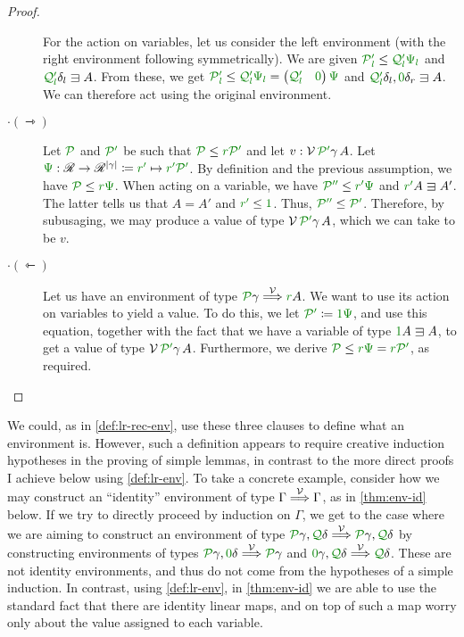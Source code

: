 \begin{proof}
\begin{description}
      For the action on variables, let us consider the left environment (with
      the right environment following symmetrically).
      We are given $\gr{\grP'_l} \leq \gr{\grQ'_l}\gr\Psi_{\gr l}$ and
      $\gr{\grQ'_l}\delta_l \sqni A$.
      From these, we get
      $\gr{\grP'_l} \leq \gr{\grQ'_l}\gr\Psi_{\gr l} =
      \begin{pmatrix} \gr{\grQ'_l} & \gr0 \end{pmatrix}\gr\Psi$ and
      $\gr{\grQ'_l}\delta_l, \gr0\delta_r \sqni A$.
      We can therefore act using the original environment.
    \item[$\cdot(\rightarrowtriangle)$]
      Let $\grP$ and $\grPprime$ be such that $\grP \leq \gr r\grPprime$ and let
      $v : \V\,\grPprime\gamma\,A$.
      Let $\gr\Psi : \Ann \to \Ann^{\size\gamma}
      \coloneqq \gr r\gr' \mapsto \gr r\gr'\grPprime$.
      By definition and the previous assumption, we have
      $\grP \leq \gr r\gr\Psi$.
      When acting on a variable, we have $\grP\gr{''} \leq \gr r\gr'\gr\Psi$
      and $\gr r\gr'A \sqni A'$.
      The latter tells us that $A = A'$ and $\gr r\gr' \leq \gr1$.
      Thus, $\grP\gr{''} \leq \grPprime$.
      Therefore, by subusaging, we may produce a value of type
      $\V\,\grPprime\gamma\,A$, which we can take to be $v$.
    \item[$\cdot(\leftarrowtriangle)$]
      Let us have an environment of type $\grP\gamma \env\V \gr rA$.
      We want to use its action on variables to yield a value.
      To do this, we let $\grPprime \coloneqq \gr1\gr\Psi$, and use this
      equation, together with the fact that we have a variable of type
      $\gr1A \sqni A$, to get a value of type $\V\,\grPprime\gamma\,A$.
      Furthermore, we derive $\grP \leq \gr r\gr\Psi = \gr r\grPprime$, as
      required.
  \end{description}
\end{proof}

We could, as in \cref{def:lr-rec-env}, use these three clauses to define what an
environment is.
However, such a definition appears to require creative induction hypotheses in
the proving of simple lemmas, in contrast to the more direct proofs I achieve
below using \cref{def:lr-env}.
To take a concrete example, consider how we may construct an ``identity''
environment of type $\Gamma \stackrel{\mathcal V}\Longrightarrow \Gamma$, as in \cref{thm:env-id} below.
If we try to directly proceed by induction on $\Gamma$, we get to the case where
we are aiming to construct an environment of type
$\grP\gamma, \grQ\delta \env\V \grP\gamma, \grQ\delta$ by constructing
environments of types $\grP\gamma, \gr0\delta \env\V \grP\gamma$ and
$\gr0\gamma, \grQ\delta \env\V \grQ\delta$.
These are not identity environments, and thus do not come from the hypotheses of
a simple induction.
In contrast, using \cref{def:lr-env}, in \cref{thm:env-id} we are able to use
the standard fact that there are identity linear maps, and on top of such a map
worry only about the value assigned to each variable.

